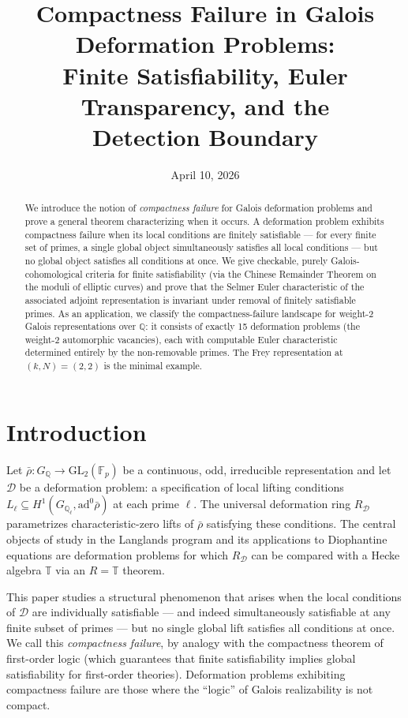\documentclass[12pt]{amsart}
\title[Compactness Failure in Galois Deformation Problems]{Compactness Failure in Galois Deformation Problems:\\Finite Satisfiability, Euler Transparency, and the\\Detection Boundary}
\author{}
\date{April 10, 2026}
\theoremstyle{definition}
\theoremstyle{remark}
\newcommand{\GL}{\mathrm{GL}}
\newcommand{\ad}{\mathrm{ad}}
\newcommand{\rhobar}{\bar{\rho}}
\newcommand{\Fp}{\mathbb{F}_p}
\newcommand{\GQ}{G_{\mathbb{Q}}}
\newcommand{\GQl}{G_{\mathbb{Q}_\ell}}
\begin{document}
\begin{abstract}
We introduce the notion of \emph{compactness failure} for Galois deformation problems and prove a general theorem characterizing when it occurs. A deformation problem exhibits compactness failure when its local conditions are finitely satisfiable --- for every finite set of primes, a single global object simultaneously satisfies all local conditions --- but no global object satisfies all conditions at once. We give checkable, purely Galois-cohomological criteria for finite satisfiability (via the Chinese Remainder Theorem on the moduli of elliptic curves) and prove that the Selmer Euler characteristic of the associated adjoint representation is invariant under removal of finitely satisfiable primes. As an application, we classify the compactness-failure landscape for weight-2 Galois representations over $\mathbb{Q}$: it consists of exactly 15 deformation problems (the weight-2 automorphic vacancies), each with computable Euler characteristic determined entirely by the non-removable primes. The Frey representation at $(k, N) = (2, 2)$ is the minimal example.
\end{abstract}

\maketitle

\section{Introduction}

Let $\rhobar : \GQ \to \GL_2(\Fp)$ be a continuous, odd, irreducible representation and let $\mathcal{D}$ be a deformation problem: a specification of local lifting conditions $L_\ell \subseteq H^1(\GQl, \ad^0\rhobar)$ at each prime $\ell$. The universal deformation ring $R_{\mathcal{D}}$ parametrizes characteristic-zero lifts of $\rhobar$ satisfying these conditions. The central objects of study in the Langlands program and its applications to Diophantine equations are deformation problems for which $R_{\mathcal{D}}$ can be compared with a Hecke algebra $\mathbb{T}$ via an $R = \mathbb{T}$ theorem.

This paper studies a structural phenomenon that arises when the local conditions of $\mathcal{D}$ are individually satisfiable --- and indeed simultaneously satisfiable at any finite subset of primes --- but no single global lift satisfies all conditions at once. We call this \emph{compactness failure}, by analogy with the compactness theorem of first-order logic (which guarantees that finite satisfiability implies global satisfiability for first-order theories). Deformation problems exhibiting compactness failure are those where the ``logic'' of Galois realizability is not compact.
\end{document}
